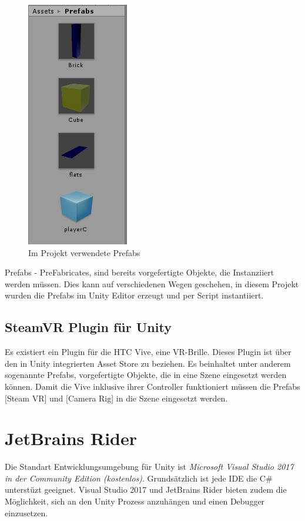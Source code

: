 \begin{figure}[h!]
	\centering
	\includegraphics[scale=1]{bilder/prefabs.jpg}
	\caption{Im Projekt verwendete Prefabs}
\end{figure}

Prefabs - PreFabricates, sind bereits vorgefertigte Objekte, die Instanziiert werden müssen. Dies kann auf verschiedenen Wegen geschehen, in diesem Projekt wurden die Prefabs im Unity Editor erzeugt und per Script instantiiert.


\subsection{SteamVR Plugin für Unity}
Es existiert ein Plugin für die HTC Vive, eine VR-Brille. Dieses Plugin ist über den in Unity integrierten Asset Store zu beziehen. Es beinhaltet unter anderem sogenannte Prefabs, vorgefertigte Objekte, die in eine Szene eingesetzt werden können. Damit die Vive inklusive ihrer Controller funktioniert müssen die Prefabs [Steam VR] und [Camera Rig] in die Szene eingesetzt werden. 

\section{JetBrains Rider}
\label{Rider}
Die Standart Entwicklungsumgebung für Unity ist \emph{Microsoft Visual Studio 2017 in der Community Edition (kostenlos)}. Grundsätzlich ist jede IDE die C\# unterstüzt geeignet. Visual Studio 2017 und JetBrains Rider bieten zudem die Möglichkeit, sich an den Unity Prozess anzuhängen und einen Debugger einzusetzen. 

